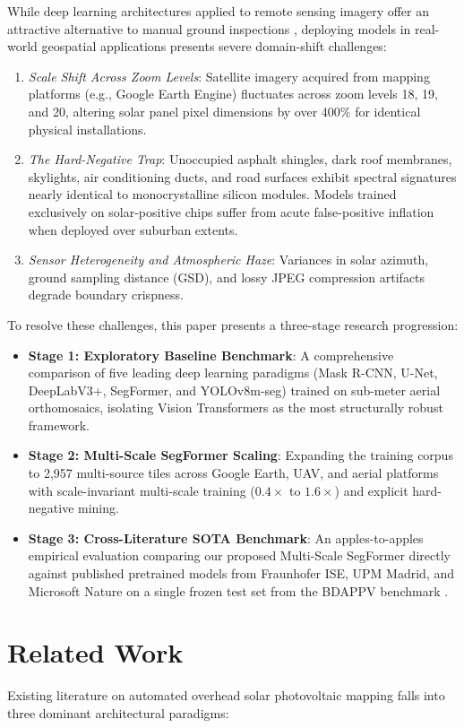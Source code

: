 \documentclass[conference]{IEEEtran}
\begin{document}
While deep learning architectures applied to remote sensing imagery offer an attractive alternative to manual ground inspections \cite{b_jiao}, deploying models in real-world geospatial applications presents severe domain-shift challenges:
\begin{enumerate}
    \item \textit{Scale Shift Across Zoom Levels}: Satellite imagery acquired from mapping platforms (e.g., Google Earth Engine) fluctuates across zoom levels 18, 19, and 20, altering solar panel pixel dimensions by over 400\% for identical physical installations.
    \item \textit{The Hard-Negative Trap}: Unoccupied asphalt shingles, dark roof membranes, skylights, air conditioning ducts, and road surfaces exhibit spectral signatures nearly identical to monocrystalline silicon modules. Models trained exclusively on solar-positive chips suffer from acute false-positive inflation when deployed over suburban extents.
    \item \textit{Sensor Heterogeneity and Atmospheric Haze}: Variances in solar azimuth, ground sampling distance (GSD), and lossy JPEG compression artifacts degrade boundary crispness.
\end{enumerate}

To resolve these challenges, this paper presents a three-stage research progression:
\begin{itemize}
    \item \textbf{Stage 1: Exploratory Baseline Benchmark}: A comprehensive comparison of five leading deep learning paradigms (Mask R-CNN, U-Net, DeepLabV3+, SegFormer, and YOLOv8m-seg) trained on sub-meter aerial orthomosaics, isolating Vision Transformers as the most structurally robust framework.
    \item \textbf{Stage 2: Multi-Scale SegFormer Scaling}: Expanding the training corpus to 2,957 multi-source tiles across Google Earth, UAV, and aerial platforms with scale-invariant multi-scale training ($0.4\times$ to $1.6\times$) and explicit hard-negative mining.
    \item \textbf{Stage 3: Cross-Literature SOTA Benchmark}: An apples-to-apples empirical evaluation comparing our proposed Multi-Scale SegFormer directly against published pretrained models from Fraunhofer ISE, UPM Madrid, and Microsoft Nature on a single frozen test set from the BDAPPV benchmark \cite{b_bdappv}.
\end{itemize}

\section{Related Work}
Existing literature on automated overhead solar photovoltaic mapping falls into three dominant architectural paradigms:
\end{document}
